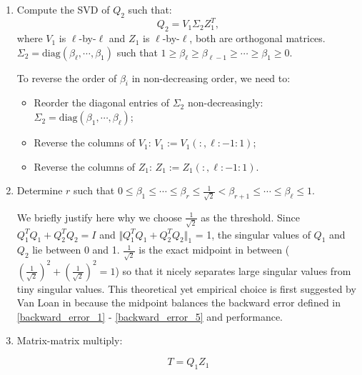 \begin{enumerate}
\item Compute the SVD of $Q_2$ such that:
\begin{equation}
Q_2 = V_{1}\Sigma_{2}Z_{1}^{T}, 
\end{equation}
where $V_{1}$ is $\ell$-by-$\ell$ and $Z_{1}$ is $\ell$-by-$\ell$, 
both are orthogonal matrices. $\Sigma_{2} = \mbox{diag}(\beta_{\ell}, \cdots, \beta_{1})$ 
such that 
$1 \geq \beta_{\ell} \geq \beta_{\ell-1} \geq \cdots \geq \beta_{1} \geq 0$. 

To reverse the order of $\beta_{i}$ in non-decreasing order, we need to:

\begin{itemize}
\item Reorder the diagonal entries of $\Sigma_{2}$ non-decreasingly: $\Sigma_{2} = \mbox{diag}(\beta_{1}, \cdots, \beta_{\ell})$; 
\item Reverse the columns of $V_{1}$: $V_{1} := V_{1}(:,\ell:-1:1)$; 
\item Reverse the columns of $Z_{1}$: $Z_{1} := Z_{1}(:,\ell:-1:1)$. 
\end{itemize}

\item Determine $r$ such that 
$0 \leq \beta_{1} \leq \cdots \leq \beta_{r} 
\leq \frac{1}{\sqrt{2}} < \beta_{r+1} 
\leq \cdots \leq \beta_{\ell} \leq 1$. 

We briefly justify here why we choose $\frac{1}{\sqrt{2}}$ as the threshold. Since $Q_{1}^{T}Q_{1} + Q_{2}^{T}Q_{2} = I$ and $\Vert Q_{1}^{T}Q_{1} + Q_{2}^{T}Q_{2} \Vert_{1}$ = 1, the singular values of $Q_{1}$ and $Q_{2}$ lie between 0 and 1. $\frac{1}{\sqrt{2}}$ is the exact midpoint in between ($(\frac{1}{\sqrt{2}})^{2} + (\frac{1}{\sqrt{2}})^{2} = 1$) so that it nicely separates large singular values from tiny singular values. This theoretical yet empirical choice is first suggested by Van Loan in \cite{vanloan85} because the midpoint balances the backward error defined in \eqref{backward_error_1} - \eqref{backward_error_5} and performance.
                
\item Matrix-matrix multiply:

\begin{equation} \label{eq-step3}
T = Q_{1}Z_{1}
\end{equation}


\end{enumerate}

